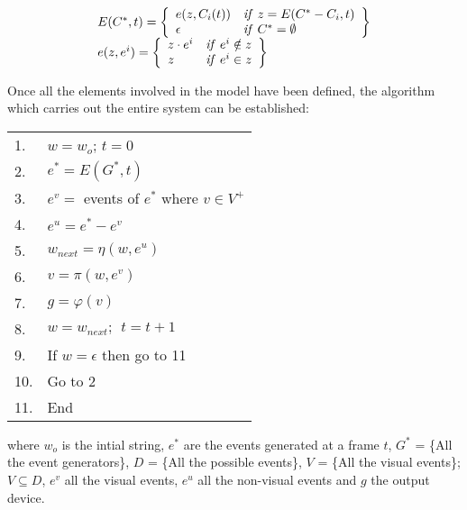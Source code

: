\documentclass[a4paper,twoside]{article}
\begin{document}
\begin{small}
\begin{equation}
\begin{tabular}{l}
    $E(C^*, t) = \left\{
    \begin{array}{ll}
        e(z, C_i(t))   &  \mathit{if}  \ z = E(C^* - C_i, t) \\
        \epsilon   &  \mathit{if} \ C^* = \emptyset
    \end{array}
    \right\}$
    \\
    $e(z, e^i) = \left\{
    \begin{array}{ll}
        z \cdot e^i   &   \mathit{if} \ e^i \notin z \\
        z    &   \mathit{if} \ e^i \in z
    \end{array}
    \right\}$
\end{tabular}
\end{equation}
\end{small}

Once all the elements involved in the model have been defined, the algorithm which carries out the
entire system can be established:

\begin{center}
\begin{small}
\begin{tabular}{|ll|}
    \hline
    1. & $w = w_o$; $t = 0$ \\
    2. & $e^* = E(G^*, t)$ \\
    3. & $e^v =$ events of $e^*$ where $v \in V^+$ \\
    4. & $e^u = e^* - e^v$ \\
    5. & $w_{next} = \eta(w, e^u)$ \\
    6. & $v =  \pi(w, e^v)$ \\
    7. & $g = \varphi(v)$ \\
    8. & $w = w_{next}; \ \ t = t + 1$ \\
    9. & If $w = \epsilon$ then go to 11 \\
    10. & Go to 2 \\
    11. & End \\
\hline
\end{tabular}
\end{small}
\end{center}

\noindent where $w_o$ is the intial string, $e^*$ are the events generated at a frame $t$, $G^*$ =
\{All the event generators\}, $D$ = \{All the possible events\}, $V$ = \{All the visual events\};
$V \subseteq D$, $e^v$ all the visual events, $e^u$ all the non-visual events and $g$ the output
device.
\end{document}

